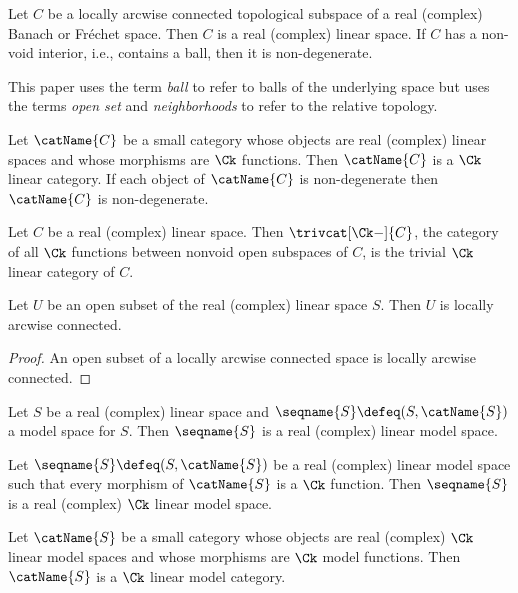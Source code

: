 \documentclass{article}
\begin{document}
\begin{definition}
{
  \showlabelsinline
  \label{def:lin}
}
Let $C$ be a locally arcwise connected topological subspace of a real
(complex) Banach or Fr\'echet space. Then $C$ is a real (complex) linear
space.  If $C$ has a non-void interior, i.e., contains a ball, then it
is non-degenerate.

\begin{remark}
This paper uses the term \textit{ball} to refer to balls of the
underlying space but uses the terms \textit{open set} and
\textit{neighborhoods} to refer to the relative topology.
\end{remark}

Let $\catName{C}$ be a small category whose objects are real (complex)
linear spaces and whose morphisms are $\Ck$ functions. Then
$\catName{C}$ is a $\Ck$ linear category.  If each object of
$\catName{C}$ is non-degenerate then $\catName{C}$ is non-degenerate.

Let $C$ be a real (complex) linear space. Then $\trivcat[\Ck-]{C}$, the
category of all $\Ck$ functions between nonvoid open subspaces of $C$,
is the trivial $\Ck$ linear category of $C$.
\end{definition}

\begin{lemma}
Let $U$ be an open subset of the real (complex) linear space $S$. Then
$U$ is locally arcwise connected.

\begin{proof}
An open subset of a locally arcwise connected space is locally arcwise
connected.
\end{proof}
\end{lemma}

\begin{definition}
Let $S$ be a real (complex) linear space and
$\seqname{S} \defeq (S, \catName{S})$ a model space for $S$.
Then $\seqname{S}$ is a real (complex) linear model space.

Let $\seqname{S} \defeq (S, \catName{S})$ be a real (complex) linear
model space such that every morphism of $\catName{S}$ is a $\Ck$
function. Then $\seqname{S}$ is a real (complex) $\Ck$ linear model
space.

Let $\catName{S}$ be a small category whose objects are real (complex)
$\Ck$ linear model spaces and whose morphisms are $\Ck$ model functions.
Then $\catName{S}$ is a $\Ck$ linear model category.
\end{definition}
\end{document}
